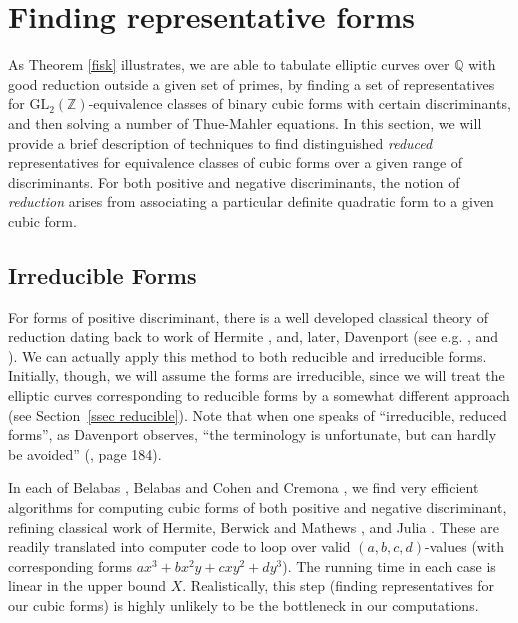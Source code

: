 \section{Finding representative forms} \label{rep}

As Theorem \ref{fisk} illustrates, we are able to tabulate elliptic curves over $\mathbb{Q}$ with good reduction outside a given set of primes, 
by finding a set of representatives for $\mbox{GL}_2 ( \mathbb{Z})$-equivalence classes of binary cubic forms with 
certain discriminants, and then solving a number of Thue-Mahler equations. In this section, we will provide a brief description of techniques to find 
distinguished \emph{reduced} representatives for equivalence classes of cubic forms over a given range of 
discriminants. For both positive and negative discriminants, the notion of \emph{reduction} arises from associating a 
particular definite quadratic form to a given cubic form. 

\subsection{Irreducible Forms}
For forms of positive discriminant, there is a well developed classical theory of reduction dating back to work of
Hermite \cite{Her1}, \cite{Her2} and, later, Davenport (see e.g. \cite{Dav}, \cite{Dav2} and \cite{DaHe}).  We can actually apply 
this method to both reducible and irreducible forms. Initially, though, we will assume the forms are irreducible, since we will treat 
the elliptic curves corresponding to reducible forms by a somewhat different approach (see Section~\ref{ssec reducible}). 
Note that when one speaks of ``irreducible, reduced forms'',
as Davenport observes,
``the terminology is unfortunate, but can hardly be avoided'' (\cite{Dav3}, page 184).

In each of Belabas \cite{Be}, Belabas and Cohen \cite{BeCo} and Cremona 
\cite{Cr}, we find very efficient algorithms for computing cubic forms of both positive and negative discriminant, refining classical work of Hermite, Berwick 
and Mathews \cite{BeMa}, and Julia \cite{Ju}. These are  readily translated into computer code to loop over valid $(a,b,c,d)$-values (with corresponding forms $ax^3+bx^2y+cxy^2+dy^3$).  The running time in each case is linear in the upper bound $X$.
Realistically, this step (finding representatives for our cubic forms) is highly unlikely to be the bottleneck in our computations.
  

